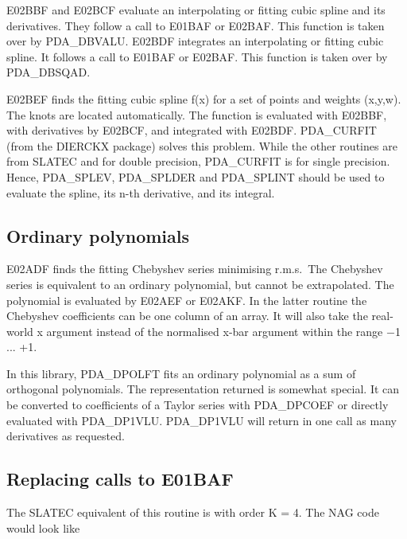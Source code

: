 \documentclass[11pt,twoside,nolof]{starlink}
\begin{document}
   E02BBF and E02BCF evaluate an interpolating or fitting cubic spline
   and its derivatives. They follow a call to E01BAF or E02BAF.
   This function is taken over by PDA\_DBVALU.
   E02BDF integrates an interpolating or fitting cubic spline. It
   follows a call to E01BAF or E02BAF. This function is taken over by
   PDA\_DBSQAD.

   E02BEF finds the fitting cubic spline f(x) for a set of points and
   weights (x,y,w). The knots are located automatically. The function is
   evaluated with E02BBF, with derivatives by E02BCF, and integrated
   with E02BDF. PDA\_CURFIT (from the DIERCKX package) solves this problem.
   While the other routines are from SLATEC and for double precision,
   PDA\_CURFIT is for single precision. Hence, PDA\_SPLEV, PDA\_SPLDER
   and PDA\_SPLINT should be used to evaluate the spline, its n-th derivative,
   and its integral.


\subsection{Ordinary polynomials}

   E02ADF finds the fitting Chebyshev series minimising r.m.s.\ The
   Chebyshev series is equivalent to an ordinary polynomial, but cannot
   be extrapolated. The
   polynomial is evaluated by E02AEF or E02AKF. In the latter
   routine the Chebyshev coefficients can be one column of an array.
   It will also take the real-world x argument instead of the normalised
   x-bar argument within the range $-$1 ... +1.

   In this library, PDA\_DPOLFT fits an ordinary polynomial as a sum of
   orthogonal polynomials. The representation returned is somewhat
   special. It can be converted to coefficients of a Taylor series with
   PDA\_DPCOEF or directly evaluated with PDA\_DP1VLU. PDA\_DP1VLU will
   return in one call as many derivatives as requested.


\subsection{\label{m_e01baf}Replacing calls to E01BAF}

   The SLATEC equivalent of this routine is
   with order K = 4. The NAG code would look like
\end{document}
